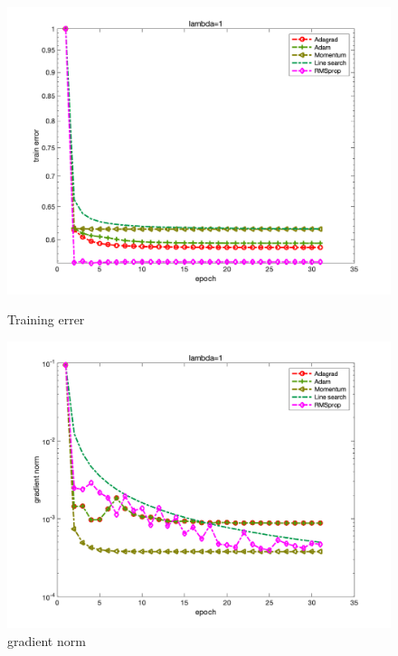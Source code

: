 \documentclass{article}
\begin{document}
\begin{figure}[H]
	\begin{minipage}{0.33\linewidth}
		\centering
		\includegraphics[width=1\linewidth]{./fig/fval_c2}
		\caption{Training errer}
	\end{minipage}
	\begin{minipage}{0.33\linewidth}
		\centering
		\includegraphics[width=1\linewidth]{./fig/gnorm_c2}
		\caption{gradient norm}
	\end{minipage}
	\begin{minipage}{0.33\linewidth}
		\centering

\end{minipage}
\end{figure}
\end{document}
